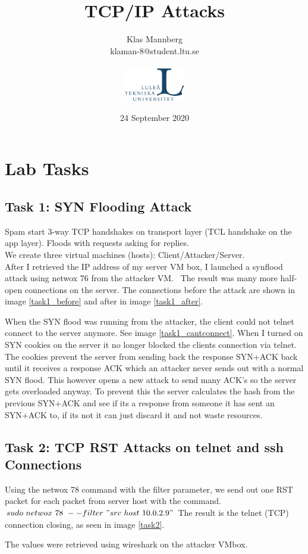 \documentclass[a4paper]{article}
\title{TCP/IP Attacks}
\author{
Klas Mannberg \\
{klaman-8@student.ltu.se
} \\ \\
\includegraphics[width=0.2\textwidth]{ltu_swe.jpg}}
\date{24 September 2020}
\begin{document}
\maketitle


\tableofcontents


\section{Lab Tasks}
\subsection{Task 1: SYN Flooding Attack}
Spam start 3-way TCP handshakes on transport layer (TCL handshake on the app layer). Floods with requests asking for replies. \\
We create three virtual machines (hosts): Client/Attacker/Server. \\
After I retrieved the IP address of my server VM box, I launched a synflood attack using netwox 76 from the attacker VM. 
\ The result was many more half-open connections on the server. The connections before the attack are shown in image \ref{task1_before} and after in image \ref{task1_after}.

When the SYN flood was running from the attacker, the client could not telnet connect to the server anymore. See image \ref{task1_cantconnect}.
When I turned on SYN cookies on the server it no longer blocked the clients connection via telnet.\\
The cookies prevent the server from sending back the response SYN+ACK back until it receives a response ACK which an attacker never sends out with a normal SYN flood. This however opens a new attack to send many ACK's so the server gets overloaded anyway. To prevent this the server calculates the hash from the previous SYN+ACK and see if its a response from someone it has sent an SYN+ACK to, if its not it can just discard it and not waste resources.\\
\subsection{Task 2: TCP RST Attacks on telnet and ssh Connections}
Using the netwox 78 command with the filter parameter, we send out one RST packet for each packet from server host with the command. $sudo\ netwox\ 78\ --filter\ "src\ host\ 10.0.2.9"$ The result is the telnet (TCP) connection closing, as seen in image \ref{task2}.

The values were retrieved using wireshark on the attacker VMbox.
\end{document}
